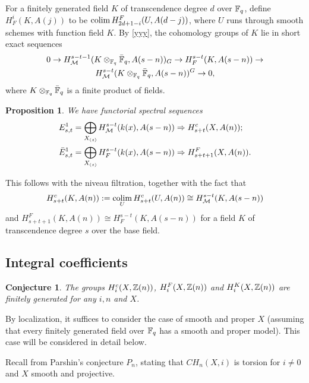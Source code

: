 \documentclass[nospthms,envcountsect]{svmult} %
\newtheorem{proposition}[theorem]       {Proposition}
\newtheorem{conjecture} [theorem]       {Conjecture}
\begin{document}
For a finitely generated field $K$ of transcendence degree $d$ over ${{\mathbb F}}_q$, 
define $H^i_F(K,A(j))$ to be $\colim H_{2d+1-i}^F(U,A(d-j))$,
where $U$ runs through smooth schemes with function field $K$.
By \eqref{yyy}, the cohomology groups of $K$ lie in short exact sequences
\begin{multline}\label{frobdescent}
0\to H^{s-t-1}_{\mathcal M}(K\otimes_{{{\mathbb F}}_q}\bar {{{\mathbb F}}}_q,A(s-n))_G
\to H^{s-t}_F(K,A(s-n))\to \\ 
H^{s-t}_{\mathcal M}(K\otimes_{{{\mathbb F}}_q}\bar {{{\mathbb F}}}_q,A(s-n))^G\to  0, 
\end{multline}
where $K\otimes_{{{\mathbb F}}_q}\bar {{{\mathbb F}}}_q$ is a finite product of fields.



\begin{proposition}\label{ssprop}
We have functorial spectral sequences
\begin{align*}
E^1_{s,t}=\bigoplus_{X_{(s)}}
H^{s-t}_{\mathcal M}(k(x),A(s-n))&\Rightarrow H_{s+t}^c(X,A(n));\\
\bar E^1_{s,t}=\bigoplus_{X_{(s)}}
H^{s-t}_F(k(x),A(s-n))&\Rightarrow H_{s+t+1}^F(X,A(n)).\\
\end{align*}
\end{proposition}

\proof 
This follows with the niveau filtration, together with 
the fact that 
$$H_{s+t}^c(K,A(n)):= \colim_{U} H_{s+t}^c(U,A(n))
\cong H^{s-t}_\Nis(K,A(s-n))$$
and $H_{s+t+1}^F(K,A(n))\cong H^{s-t}_F(K,A(s-n))$
for a field $K$ of transcendence degree $s$ over the base field.
\proofend




\subsection{Integral coefficients}
\begin{conjecture}\label{mainhom}
The groups $H_i^c(X,{{\mathbb Z}}(n))$, $H_{i}^F(X,{{\mathbb Z}}(n))$ and $H_{i}^K(X,{{\mathbb Z}}(n))$
are finitely generated for any $i, n$ and $X$.
\end{conjecture}

By localization, it suffices to consider the case of smooth and proper
$X$ (assuming that every finitely generated field over ${{\mathbb F}}_q$ 
has a smooth and proper model).
This case will be considered in detail below.



Recall from \cite{ichparshin} Parshin's conjecture $P_n$, stating that
$CH_n(X,i)$ is torsion for $i\not=0$ and $X$ smooth and projective.
\end{document}
